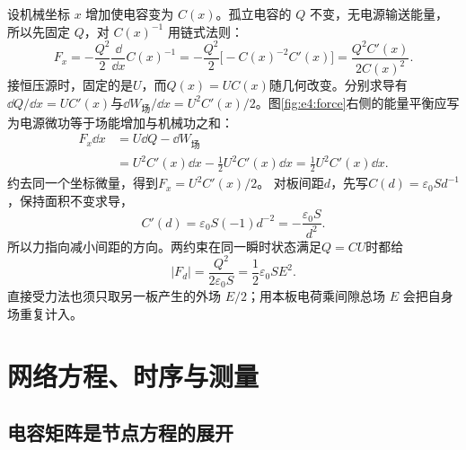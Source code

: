 设机械坐标 $x$ 增加使电容变为 $C(x)$。孤立电容的 $Q$ 不变，无电源输送能量，所以先固定 $Q$，对 $C(x)^{-1}$ 用链式法则：
\[
 F_x=-\frac{Q^2}{2}\frac{\dd}{\dd x}C(x)^{-1}
 =-\frac{Q^2}{2}\bigl[-C(x)^{-2}C'(x)\bigr]
 =\frac{Q^2C'(x)}{2C(x)^2}.
\]接恒压源时，固定的是$U$，而$Q(x)=UC(x)$随几何改变。分别求导有$\dd Q/\dd x=UC'(x)$与$\dd W_{\text{场}}/\dd x=U^2C'(x)/2$。图\ref{fig:e4:force}右侧的能量平衡应写为电源微功等于场能增加与机械功之和：
\[
\begin{aligned}
F_x\dd x&=U\dd Q-\dd W_{\text{场}}\\
&=U^2C'(x)\dd x-\frac12U^2C'(x)\dd x
=\frac12U^2C'(x)\dd x.
\end{aligned}
\]
约去同一个坐标微量，得到$F_x=U^2C'(x)/2$。
对板间距$d$，先写$C(d)=\varepsilon_0Sd^{-1}$，保持面积不变求导，
\[
C'(d)=\varepsilon_0S(-1)d^{-2}=-\frac{\varepsilon_0S}{d^2}.
\]
所以力指向减小间距的方向。两约束在同一瞬时状态满足$Q=CU$时都给
\[
 |F_d|=\frac{Q^2}{2\varepsilon_0S}=\frac12\varepsilon_0SE^2.
\]
直接受力法也须只取另一板产生的外场 $E/2$；用本板电荷乘间隙总场 $E$ 会把自身场重复计入。

\section{网络方程、时序与测量}
\subsection{电容矩阵是节点方程的展开}

